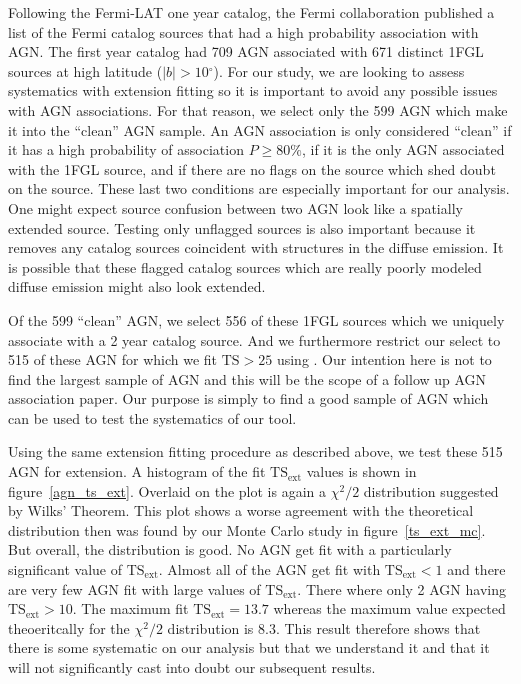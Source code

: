 \documentclass[preprint]{aastex}
\newcommand{\tsext}{{\ensuremath{\text{TS}_\text{ext}}}\xspace}
\newcommand{\ts}{\text{TS}\xspace}
\renewcommand{\deg}{\ensuremath{^\circ}\xspace}
\newcommand{\pointlike}{\text{\em pointlike}\xspace}
\begin{document}
Following the Fermi-LAT one year catalog, the Fermi collaboration
published a list of the Fermi catalog sources that had a high probability
association with AGN. The first year catalog had 709 AGN associated with
671 distinct 1FGL sources at high latitude ($|b|>10\deg$).  For our
study, we are looking to assess systematics with extension fitting so
it is important to avoid any possible issues with AGN associations.
For that reason, we select only the 599 AGN which make it into the
``clean'' AGN sample. An AGN association is only considered ``clean''
if it has a high probability of association $P\ge 80\%$, if it is the
only AGN associated with the 1FGL source, and if there are no flags
on the source which shed doubt on the source\cite{first_cat}. These last two
conditions are especially important for our analysis. One might expect
source confusion between two AGN look like a spatially extended source.
Testing only unflagged sources is also important because it removes
any catalog sources coincident with structures in the diffuse emission.
It is possible that these flagged catalog sources which are really poorly
modeled diffuse emission might also look extended.

Of the 599 ``clean'' AGN, we select 556 of these 1FGL sources which
we uniquely associate with a 2 year catalog source. And we furthermore
restrict our select to 515 of these AGN for which we fit $\ts>25$ using
\pointlike.  Our intention here is not to find the largest sample of
AGN and this will be the scope of a follow up AGN association paper. Our
purpose is simply to find a good sample of AGN which can be used to
test the systematics of our tool.

Using the same extension fitting procedure as described above, we
test these 515 AGN for extension. A histogram of the fit \tsext values
is shown in figure~\ref{agn_ts_ext}. Overlaid on the plot is again a
$\chi^2/2$ distribution suggested by Wilks' Theorem.  This plot shows
a worse agreement with the theoretical distribution then was found
by our Monte Carlo study in figure~\ref{ts_ext_mc}.  But overall, the
distribution is good. No AGN get fit with a particularly significant
value of $\tsext$. Almost all of the AGN get fit with $\tsext<1$ and
there are very few AGN fit with large values of \tsext.  There where
only 2 AGN having $\tsext>10$.  The maximum fit $\tsext=13.7$ whereas the
maximum value expected theoeritcally for the $\chi^2/2$ distribution is
8.3. This result therefore shows that there is some systematic on our
analysis but that we understand it and that it will not significantly
cast into doubt our subsequent results.
\end{document}
